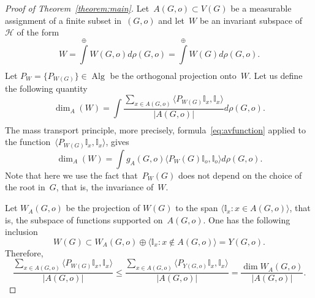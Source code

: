 \documentclass[10pt,a4paper]{amsart}
\DeclareMathOperator{\Alg}{Alg} %
\DeclareMathOperator{\Gr}{{\mathcal{G}_*}}
\begin{document}
\begin{proof}[Proof of Theorem~\ref{theorem:main}]
    Let~$A(G,o) \subset V(G)$ be a measurable assignment of a finite subset in~$(G,o)$ and %
    let~$W$ be an { invariant} subspace of~$\mathcal{H}$ of the form 
    $$
    W = \int\limits^{\oplus}_{\Gr} W{(G,o)} d \rho(G,o)  = \int\limits^{\oplus}_{\Gr} W{(G)} d \rho(G,o).
    $$
    Let $P_W = \{P_{W(G)}\} \in \Alg$ be the orthogonal projection onto~$W$. Let us define the following quantity 
    $$
    \dim_A (W) = \int\limits_{\Gr} \frac{\sum_{x \in A(G,o)} \langle P_{W(G)} \mathbb I _x , \mathbb I _x\rangle}{|A(G,o)|} d \rho(G,o).
    $$
    The mass transport principle, more precisely, formula~\eqref{eq:avfunction} applied to the function~$\langle P_{W(G)} \mathbb I _x , \mathbb I _x\rangle$, gives
    $$
    \dim_A(W) = \int g_A(G,o) \langle P_W(G)\mathbb I_o, \mathbb I_o\rangle d \rho(G,o).
    $$
    Note that here we use the fact that~$P_W(G)$ does not depend on the choice of the root in~$G$, that is, the invariance of~$W$.
    
    Let $W_A(G,o)$ be the projection of $W(G)$ to the span $\langle \mathbb I_x \colon x\in A(G,o)\rangle$, that is, the subspace of functions supported on~$A(G,o)$. One has the following inclusion  
    $$
    W{(G)} \subset  W_A(G,o) \oplus \langle \mathbb I_x \colon x\not \in A(G,o)\rangle = Y(G,o).
    $$
    Therefore, 
    \begin{equation}\label{eq_proofthm1_1}
        \frac{\sum_{x \in A(G,o)} \langle P_{W(G)} \mathbb I _x , \mathbb I _x\rangle}{|A(G,o)|} \le 
    \frac{\sum_{x \in A(G,o)} \langle P_{Y(G,o)} \mathbb I _x , \mathbb I _x\rangle}{|A(G,o)|} =
    \frac{\dim W_A (G,o)}{|A(G,o)|}.
    \end{equation}


\end{proof}
\end{document}
